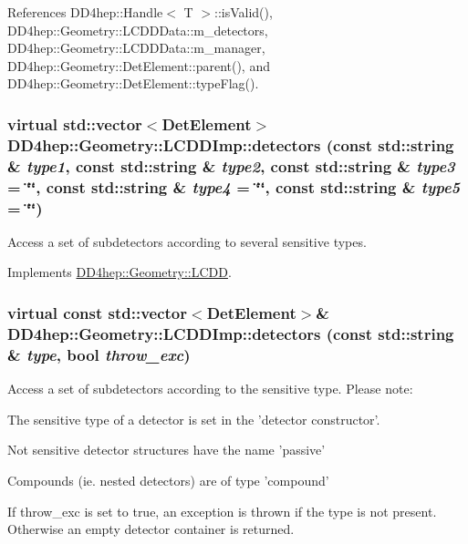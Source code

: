 References DD4hep::Handle$<$ T $>$::isValid(), DD4hep::Geometry::LCDDData::m\_\-detectors, DD4hep::Geometry::LCDDData::m\_\-manager, DD4hep::Geometry::DetElement::parent(), and DD4hep::Geometry::DetElement::typeFlag().\hypertarget{class_d_d4hep_1_1_geometry_1_1_l_c_d_d_imp_aa0b21c4dda1cce4ae1681f6b75b1b380}{
\subsubsection[{detectors}]{\setlength{\rightskip}{0pt plus 5cm}virtual std::vector$<${\bf DetElement}$>$ DD4hep::Geometry::LCDDImp::detectors (const std::string \& {\em type1}, \/  const std::string \& {\em type2}, \/  const std::string \& {\em type3} = {\ttfamily \char`\"{}\char`\"{}}, \/  const std::string \& {\em type4} = {\ttfamily \char`\"{}\char`\"{}}, \/  const std::string \& {\em type5} = {\ttfamily \char`\"{}\char`\"{}})}}
\label{class_d_d4hep_1_1_geometry_1_1_l_c_d_d_imp_aa0b21c4dda1cce4ae1681f6b75b1b380}


Access a set of subdetectors according to several sensitive types. 

Implements \hyperlink{class_d_d4hep_1_1_geometry_1_1_l_c_d_d_aee911f853a0e585f0ac9be7852ed6954}{DD4hep::Geometry::LCDD}.\hypertarget{class_d_d4hep_1_1_geometry_1_1_l_c_d_d_imp_a31d7d48549b622ff2aef524cc1996993}{
\subsubsection[{detectors}]{\setlength{\rightskip}{0pt plus 5cm}virtual const std::vector$<${\bf DetElement}$>$\& DD4hep::Geometry::LCDDImp::detectors (const std::string \& {\em type}, \/  bool {\em throw\_\-exc})}}
\label{class_d_d4hep_1_1_geometry_1_1_l_c_d_d_imp_a31d7d48549b622ff2aef524cc1996993}


Access a set of subdetectors according to the sensitive type. Please note:
\begin{DoxyItemize}
\item The sensitive type of a detector is set in the 'detector constructor'.
\item Not sensitive detector structures have the name 'passive'
\item Compounds (ie. nested detectors) are of type 'compound'
\item If throw\_\-exc is set to true, an exception is thrown if the type is not present. Otherwise an empty detector container is returned. 
\end{DoxyItemize}

